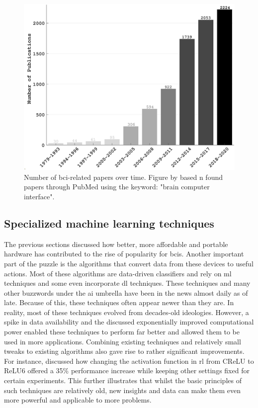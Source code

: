\begin{figure}[ht]
    \centering
    \includegraphics[width=0.6\linewidth]{images/introduction/papers_on_bci.jpg}
    \captionsetup{width=0.9\linewidth}
    \captionsetup{justification=centering}
    \caption{Number of \gls{bci}-related papers over time. Figure by \citet{bci_progress_overview} based n found papers through PubMed using the keyword: "brain computer interface".}
    \label{fig:bci_publications}
\end{figure}



\subsection{Specialized machine learning techniques}
\label{subsec:bci_gaining_popularity_improved_ml}

The previous sections discussed how better, more affordable and portable hardware has contributed to the rise of popularity for \glspl{bci}.
Another important part of the puzzle is the algorithms that convert data from these devices to useful actions.
Most of these algorithms are data-driven classifiers and rely on \gls{ml} techniques and some even incorporate \gls{dl} techniques.
These techniques and many other buzzwords under the \gls{ai} umbrella have been in the news almost daily as of late.
Because of this, these techniques often appear newer than they are.
In reality, most of these techniques evolved from decades-old ideologies.
However, a spike in data availability and the discussed exponentially improved computational power enabled these techniques to perform far better and allowed them to be used in more applications.
Combining existing techniques and relatively small tweaks to existing algorithms also gave rise to rather significant improvements.
For instance, \citet{rl_activation_function_compare} discussed how changing the activation function in \gls{rl} from CReLU to ReLU6 offered a 35\% performance increase while keeping other settings fixed for certain experiments.
This further illustrates that whilst the basic principles of such techniques are relatively old, new insights and data can make them even more powerful and applicable to more problems.

